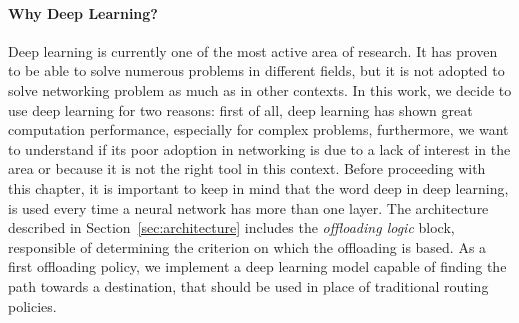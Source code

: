 \paragraph{Why Deep Learning?} Deep learning is currently one of the most active area of research. It has proven to be able to solve numerous problems in different fields, but it is not adopted to solve networking problem as much as in other contexts. In this work, we decide to use deep learning for two reasons: first of all, deep learning has shown great computation performance, especially for complex problems, furthermore, we want to understand if its poor adoption in networking is due to a lack of interest in the area or because it is not the right tool in this context. Before proceeding with this chapter, it is important to keep in mind that  the word deep in deep learning, is used every time a neural network has more than one layer. The architecture described in Section~\ref{sec:architecture} includes the \textit{offloading logic} block, responsible of determining the criterion on which the offloading is based. As a first offloading policy, we implement a deep learning model capable of finding the path towards a destination, that should be used in place of traditional routing policies. 

